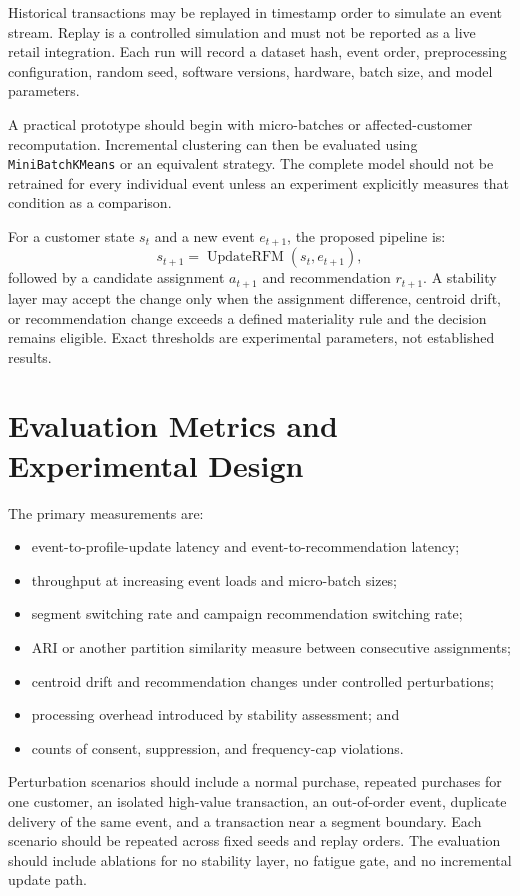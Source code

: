 \documentclass[conference]{IEEEtran}
\begin{document}
Historical transactions may be replayed in timestamp order to simulate an event stream. Replay is a controlled simulation and must not be reported as a live retail integration. Each run will record a dataset hash, event order, preprocessing configuration, random seed, software versions, hardware, batch size, and model parameters.

A practical prototype should begin with micro-batches or affected-customer recomputation. Incremental clustering can then be evaluated using \texttt{MiniBatchKMeans} or an equivalent strategy. The complete model should not be retrained for every individual event unless an experiment explicitly measures that condition as a comparison.

For a customer state $s_t$ and a new event $e_{t+1}$, the proposed pipeline is:
\begin{equation}
s_{t+1}=\operatorname{UpdateRFM}(s_t,e_{t+1}),
\end{equation}
followed by a candidate assignment $a_{t+1}$ and recommendation $r_{t+1}$. A stability layer may accept the change only when the assignment difference, centroid drift, or recommendation change exceeds a defined materiality rule and the decision remains eligible. Exact thresholds are experimental parameters, not established results.

\section{Evaluation Metrics and Experimental Design}
The primary measurements are:
\begin{itemize}
    \item event-to-profile-update latency and event-to-recommendation latency;
    \item throughput at increasing event loads and micro-batch sizes;
    \item segment switching rate and campaign recommendation switching rate;
    \item ARI or another partition similarity measure between consecutive assignments;
    \item centroid drift and recommendation changes under controlled perturbations;
    \item processing overhead introduced by stability assessment; and
    \item counts of consent, suppression, and frequency-cap violations.
\end{itemize}

Perturbation scenarios should include a normal purchase, repeated purchases for one customer, an isolated high-value transaction, an out-of-order event, duplicate delivery of the same event, and a transaction near a segment boundary. Each scenario should be repeated across fixed seeds and replay orders. The evaluation should include ablations for no stability layer, no fatigue gate, and no incremental update path.
\end{document}
